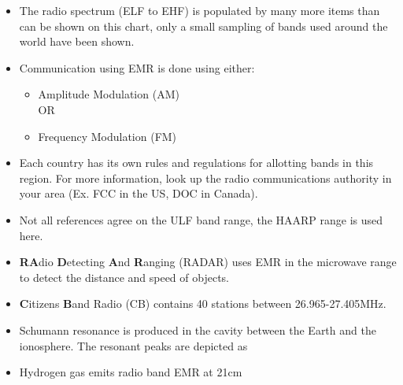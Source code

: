 \begin{itemize}

\item The radio spectrum (ELF to EHF) is populated by many more items than can be shown on this chart, only a small sampling of bands used around the world have been shown.

\item Communication using EMR is done using either:
\begin{itemize}
\item Amplitude Modulation (AM)
\vspace{0.1in}\\
\vspace{0.04in}OR
\item Frequency Modulation (FM)
\vspace{0.1in}
\end{itemize}

\item Each country has its own rules and regulations for allotting bands in this region. For more information, look up the radio communications authority in your area (Ex. FCC in the US, DOC in Canada).

\item Not all references agree on the ULF band range, the HAARP range is used here.

\item {\bfseries RA}dio {\bfseries D}etecting {\bfseries A}nd {\bfseries R}anging (RADAR) uses EMR in the microwave range to detect the distance and speed of objects.

\item {\bfseries C}itizens {\bfseries B}and Radio (CB) contains 40 stations between 26.965-27.405MHz.

\item Schumann resonance is produced in the cavity between the Earth and the ionosphere. The resonant peaks are depicted as 

\item Hydrogen gas emits radio band EMR at 21cm 


\end{itemize}

